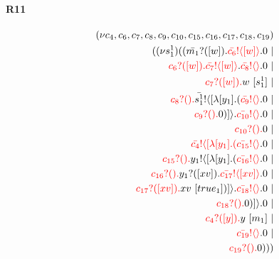 \documentclass{article}
\begin{document}
\paragraph{R11}
\begin{align*}
 (\nu c_{4},c_{6},c_{7},c_{8},c_{9},c_{10},c_{15},c_{16},c_{17},c_{18},c_{19}) \\ ( (\nu s^{1}_{1})((\color{black}\bar{m_{1}}?([w]).\color{black}\color{red}\bar{c_{6}}! \langle [w] \rangle \color{black}.0  \ | \\ \color{red}c_{6}?([w]).\color{black}\color{red}\bar{c_{7}}! \langle [w] \rangle \color{black}.\color{red}\bar{c_{8}}! \langle  \rangle \color{black}.0  \ | \\ \color{red}c_{7}?([w]).\color{black}w \ [s^{1}_{1}] \ | \\ \color{red}c_{8}?().\color{black}\color{black}\bar{s^{1}_{1}}! \langle [ \lambda [y_{1}].(\color{red}\bar{c_{9}}! \langle  \rangle \color{black}.0  \ | \\ \color{red}c_{9}?().\color{black}0 )] \rangle \color{black}.\color{red}\bar{c_{10}}! \langle  \rangle \color{black}.0  \ | \\ \color{red}c_{10}?().\color{black}0  \ | \\ \color{red}\bar{c_{4}}! \langle [ \lambda [y_{1}].(\color{red}\bar{c_{15}}! \langle  \rangle \color{black}.0  \ | \\ \color{red}c_{15}?().\color{black}\color{black}y_{1}! \langle [ \lambda [y_{1}].(\color{red}\bar{c_{16}}! \langle  \rangle \color{black}.0  \ | \\ \color{red}c_{16}?().\color{black}\color{black}y_{1}?([xv]).\color{black}\color{red}\bar{c_{17}}! \langle [xv] \rangle \color{black}.0  \ | \\ \color{red}c_{17}?([xv]).\color{black}xv \ [true_{1}])] \rangle \color{black}.\color{red}\bar{c_{18}}! \langle  \rangle \color{black}.0  \ | \\ \color{red}c_{18}?().\color{black}0 )] \rangle \color{black}.0  \ | \\ \color{red}c_{4}?([y]).\color{black}y \ [m_{1}] \ | \\ \color{red}\bar{c_{19}}! \langle  \rangle \color{black}.0  \ | \\ \color{red}c_{19}?().\color{black}0 )))
\end{align*}
\end{document}
